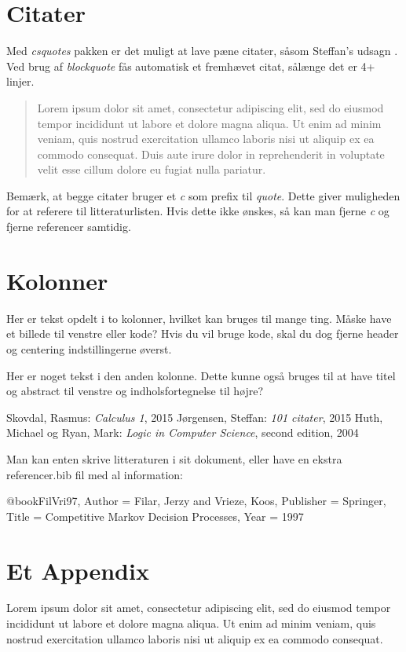 \documentclass[a4, danish]{article}
\begin{document}
\section{Citater}
Med \emph{csquotes} pakken er det muligt at lave pæne citater, såsom Steffan's udsagn . Ved brug af \emph{blockquote} fås automatisk et fremhævet citat, sålænge det er 4+ linjer.

\blockcquote[s. 1]{berlog}{Lorem ipsum dolor sit amet, consectetur adipiscing elit, sed do eiusmod tempor incididunt ut labore et dolore magna aliqua. Ut enim ad minim veniam, quis nostrud exercitation ullamco laboris nisi ut aliquip ex ea commodo consequat. Duis aute irure dolor in reprehenderit in voluptate velit esse cillum dolore eu fugiat nulla pariatur.}

Bemærk, at begge citater bruger et \emph{c} som prefix til \emph{quote}. Dette giver muligheden for at referere til litteraturlisten. Hvis dette ikke ønskes, så kan man fjerne \emph{c} og fjerne referencer samtidig.

\newpage
\section{Kolonner}
\begin{multicols}{2}

\noindent Her er tekst opdelt i to kolonner, hvilket kan bruges til mange ting. Måske have et billede til venstre eller kode? Hvis du vil bruge kode, skal du dog fjerne header og centering indstillingerne øverst.

\vfill \columnbreak

Her er noget tekst i den anden kolonne. Dette kunne også bruges til at have titel og abstract til venstre og indholsfortegnelse til højre?

\end{multicols}

\begin{thebibliography}{9}
	Skovdal, Rasmus: \emph{Calculus 1}, 2015
	Jørgensen, Steffan: \emph{101 citater}, 2015
	Huth, Michael og Ryan, Mark: \emph{Logic in Computer Science}, second edition, 2004

 Man kan enten skrive litteraturen i sit dokument, eller have en ekstra referencer.bib fil med al information:

@book{FilVri97,
Author = {Filar, Jerzy and Vrieze, Koos},
Publisher = {Springer},
Title = {Competitive Markov Decision Processes},
Year = 1997
} 
 
\end{thebibliography}



\newpage
\appendix
\section{Et Appendix}
Lorem ipsum dolor sit amet, consectetur adipiscing elit, sed do eiusmod tempor incididunt ut labore et dolore magna aliqua. Ut enim ad minim veniam, quis nostrud exercitation ullamco laboris nisi ut aliquip ex ea commodo consequat.
\end{document}
